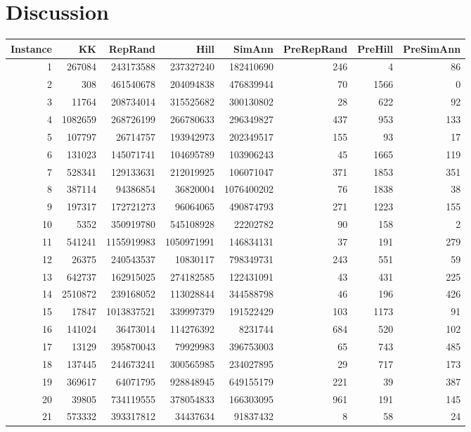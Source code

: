 \documentclass[11pt]{article}
\begin{document}
\section{Discussion}
\begin{tabular}{rrrrrrrr}
\hline
Instance & KK & RepRand & Hill & SimAnn & PreRepRand & PreHill & PreSimAnn \\
\hline
1 & 267084 & 243173588 & 237327240 & 182410690 & 246 & 4 & 86 \\
2 & 308 & 461540678 & 204094838 & 476839944 & 70 & 1566 & 0 \\
3 & 11764 & 208734014 & 315525682 & 300130802 & 28 & 622 & 92 \\
4 & 1082659 & 268726199 & 266780633 & 296349827 & 437 & 953 & 133 \\
5 & 107797 & 26714757 & 193942973 & 202349517 & 155 & 93 & 17 \\
6 & 131023 & 145071741 & 104695789 & 103906243 & 45 & 1665 & 119 \\
7 & 528341 & 129133631 & 212019925 & 106071047 & 371 & 1853 & 351 \\
8 & 387114 & 94386854 & 36820004 & 1076400202 & 76 & 1838 & 38 \\
9 & 197317 & 172721273 & 96064065 & 490874793 & 271 & 1223 & 155 \\
10 & 5352 & 350919780 & 545108928 & 22202782 & 90 & 158 & 2 \\
11 & 541241 & 1155919983 & 1050971991 & 146834131 & 37 & 191 & 279 \\
12 & 26375 & 240543537 & 10830117 & 798349731 & 243 & 551 & 59 \\
13 & 642737 & 162915025 & 274182585 & 122431091 & 43 & 431 & 225 \\
14 & 2510872 & 239168052 & 113028844 & 344588798 & 46 & 196 & 426 \\
15 & 17847 & 1013837521 & 339997379 & 191522429 & 103 & 1173 & 91 \\
16 & 141024 & 36473014 & 114276392 & 8231744 & 684 & 520 & 102 \\
17 & 13129 & 395870043 & 79929983 & 396753003 & 65 & 743 & 485 \\
18 & 137445 & 244673241 & 300565985 & 234027895 & 29 & 717 & 173 \\
19 & 369617 & 64071795 & 928848945 & 649155179 & 221 & 39 & 387 \\
20 & 39805 & 734119555 & 378054833 & 166303095 & 961 & 191 & 145 \\
21 & 573332 & 393317812 & 34437634 & 91837432 & 8 & 58 & 24 \\

\end{tabular}
\end{document}
